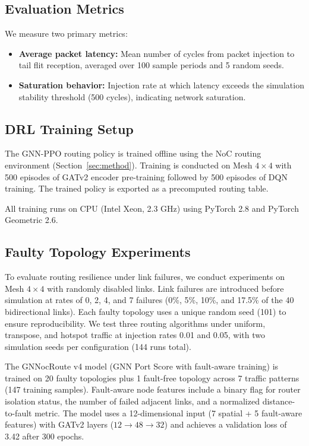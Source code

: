 \subsection{Evaluation Metrics}

We measure two primary metrics:

\begin{itemize}
    \item \textbf{Average packet latency:} Mean number of cycles from packet injection to tail flit reception, averaged over 100 sample periods and 5 random seeds.
    \item \textbf{Saturation behavior:} Injection rate at which latency exceeds the simulation stability threshold (500 cycles), indicating network saturation.
\end{itemize}

\subsection{DRL Training Setup}

The GNN-PPO routing policy is trained offline using the NoC routing environment (Section~\ref{sec:method}). Training is conducted on Mesh $4\times4$ with 500 episodes of GATv2 encoder pre-training followed by 500 episodes of DQN training. The trained policy is exported as a precomputed routing table.

All training runs on CPU (Intel Xeon, 2.3 GHz) using PyTorch 2.8 and PyTorch Geometric 2.6.

\subsection{Faulty Topology Experiments}
\label{sec:faulty}

To evaluate routing resilience under link failures, we conduct experiments on Mesh $4\times4$ with randomly disabled links. Link failures are introduced before simulation at rates of 0, 2, 4, and 7 failures (0\%, 5\%, 10\%, and 17.5\% of the 40 bidirectional links). Each faulty topology uses a unique random seed (101) to ensure reproducibility. We test three routing algorithms under uniform, transpose, and hotspot traffic at injection rates 0.01 and 0.05, with two simulation seeds per configuration (144 runs total).

The GNNocRoute v4 model (GNN Port Score with fault-aware training) is trained on 20 faulty topologies plus 1 fault-free topology across 7 traffic patterns (147 training samples). Fault-aware node features include a binary flag for router isolation status, the number of failed adjacent links, and a normalized distance-to-fault metric. The model uses a 12-dimensional input (7 spatial + 5 fault-aware features) with GATv2 layers ($12 \rightarrow 48 \rightarrow 32$) and achieves a validation loss of 3.42 after 300 epochs.

